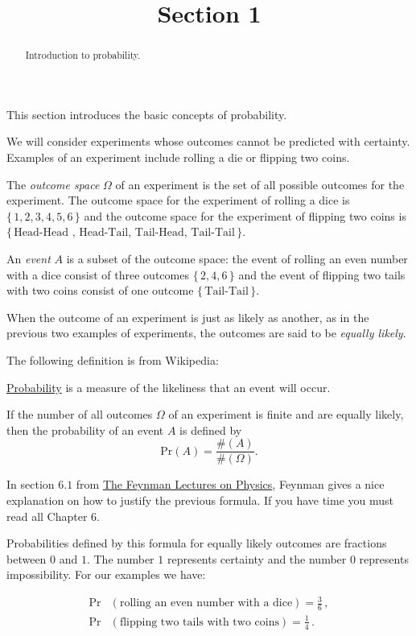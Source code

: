 \documentclass{ximera}
\title{Section 1}
\begin{document}
\begin{abstract}
Introduction to probability.
\end{abstract}
\maketitle

This section introduces the basic concepts of probability. \vspace{.25cm}

We will consider experiments whose outcomes cannot be predicted with certainty. Examples of an experiment include rolling a die or flipping two coins.

The {\it outcome space} $\Omega$ of an experiment is the set of all possible outcomes for the experiment. The outcome space for the experiment of rolling a dice is $\{\,1,2,3,4,5,6\,\}$ and the outcome space for the experiment of flipping two coins is $\{\, \text{Head-Head , Head-Tail, Tail-Head, Tail-Tail} \,\}$.

An {\it event} $A$ is a subset of the outcome space: the event of rolling an even number with a dice consist of three outcomes $\{\,2,4,6\,\}$ and the event of flipping two tails with two coins consist of one outcome $\{\, \text{Tail-Tail} \,\}$. 

When the outcome of an experiment is just as likely as another, as in the previous two examples of experiments, the outcomes are said to be {\it equally likely}. \vspace{.25cm}

The following definition is from Wikipedia: 

\href{http://en.wikipedia.org/wiki/Probability}{Probability} is a measure of the likeliness that an event will occur. \vspace{.25cm}

If the number of all outcomes $\Omega$ of an experiment is finite and are equally likely, then the probability of an event $A$ is defined by
\[
\text{Pr}(A) = \frac{ \#(A) }{ \#(\Omega)}.
\]

In section $6.1$ from \href{ http://www.feynmanlectures.caltech.edu/I_06.html#Ch6-S1}{The Feynman Lectures on Physics}, Feynman gives a nice explanation on how to justify the previous formula. If you have time you must read all Chapter $6$. \vspace{.25cm}

Probabilities defined by this formula for equally likely outcomes are fractions between $0$ and $1$. The number $1$ represents certainty and the number $0$ represents impossibility. 
For our examples we have:

\begin{align*}
\text{Pr}&( \text{rolling an even number with a dice} ) = \frac{3}{6}\,,  \\
\text{Pr}&( \text{flipping two tails with two coins} ) = \frac{1}{4}\,.
\end{align*}
\end{document}
